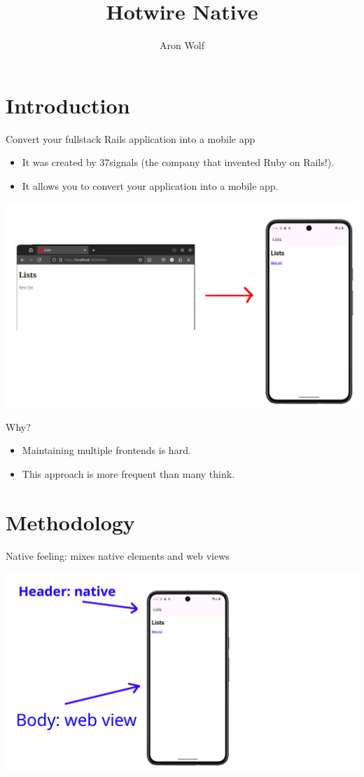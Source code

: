 \documentclass{beamer}
\title[Short Title]{Hotwire Native}
\author{Aron Wolf}
\date{}
\begin{document}
\begin{frame}
  \titlepage
\end{frame}

\section{Introduction}

\begin{frame}{Convert your fullstack Rails application into a mobile app}
  \begin{itemize}
    \item It was created by 37signals (the company that invented Ruby on Rails!).
    \item It allows you to convert your application into a mobile app.
  \end{itemize}
  \centering
  \includegraphics[width=0.8\linewidth]{images/convert-app.png}
\end{frame}

\begin{frame}{Why?}
  \begin{itemize}
    \item Maintaining multiple frontends is hard.
    \item This approach is more frequent than many think.
  \end{itemize}
\end{frame}

\section{Methodology}

\begin{frame}{Native feeling: mixes native elements and web views}

  \centering
  \includegraphics[width=0.8\linewidth]{images/header-body.png}
\end{frame}
\end{document}
